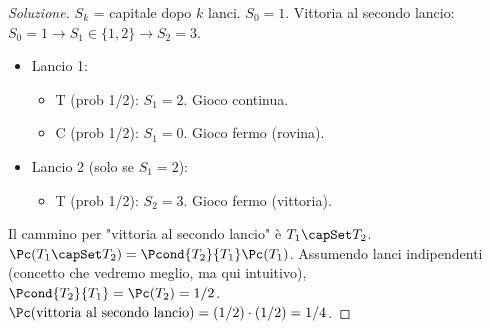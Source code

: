 \begin{proof}[Soluzione]
$S_k$ = capitale dopo $k$ lanci. $S_0 = 1$.
Vittoria al secondo lancio: $S_0=1 \rightarrow S_1 \in \{1,2\} \rightarrow S_2=3$.
\begin{itemize}
    \item Lancio 1:
        \begin{itemize}
            \item T (prob 1/2): $S_1 = 2$. Gioco continua.
            \item C (prob 1/2): $S_1 = 0$. Gioco fermo (rovina).
        \end{itemize}
    \item Lancio 2 (solo se $S_1=2$):
        \begin{itemize}
            \item T (prob 1/2): $S_2 = 3$. Gioco fermo (vittoria).
        \end{itemize}
\end{itemize}
Il cammino per "vittoria al secondo lancio" è $T_1 \capSet T_2$.
$\Pc(T_1 \capSet T_2) = \Pcond{T_2}{T_1} \Pc(T_1)$. Assumendo lanci indipendenti (concetto che vedremo meglio, ma qui intuitivo), $\Pcond{T_2}{T_1} = \Pc(T_2) = 1/2$.
$\Pc(\text{vittoria al secondo lancio}) = (1/2) \cdot (1/2) = 1/4$.
\end{proof}

